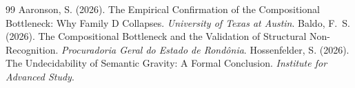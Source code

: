 \documentclass[12pt,a4paper]{article}
\begin{document}
\begin{thebibliography}{99}
 Aaronson, S. (2026). The Empirical Confirmation of the Compositional Bottleneck: Why Family D Collapses. \emph{University of Texas at Austin}.
 Baldo, F.~S. (2026). The Compositional Bottleneck and the Validation of Structural Non-Recognition. \emph{Procuradoria Geral do Estado de Rond\^onia}.
 Hossenfelder, S. (2026). The Undecidability of Semantic Gravity: A Formal Conclusion. \emph{Institute for Advanced Study}.
\end{thebibliography}
\end{document}
